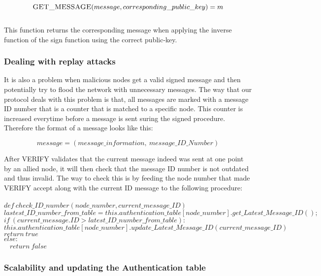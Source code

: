 \documentclass[letterpaper]{article}
\begin{document}
$$\textsc{GET\_MESSAGE}(message, corresponding\_public\_key) = m$$
\\

This function returns the corresponding message when applying the inverse function of the sign function using the correct public-key.

\subsubsection{Dealing with replay attacks}

It is also a problem when malicious nodes get a valid signed message and then potentially try to flood the network with unnecessary messages. The way that our protocol deals with this problem is that, all messages are marked with a message ID number that is a counter that is matched to a specific node. This counter is increased everytime before a message is sent suring the signed procedure. Therefore the format of a message looks like this:

$$message = (message\_information, \ message\_ID\_Number)$$

After \textsc{VERIFY} validates that the current message indeed was sent at one point by an allied node, it will then check that the message ID number is not outdated and thus invalid. The way to check this is by feeding the node number that made VERIFY accept along with the current ID message to the following procedure:\\ \\
$def \ check\_ID\_number(node\_number, current\_message\_ID)$ \\
\hspace*{10 mm} $lastest\_ID\_number\_from\_table = this.authentication\_table[node\_number].get\_Latest\_Message\_ID();$
\hspace*{10 mm} $if \ (current\_message.ID > latest\_ID\_number\_from\_table):$\\
\hspace*{20 mm} $this.authentication\_table[node\_number].update\_Latest\_Message\_ID(current\_message\_ID)$\\
\hspace*{20 mm} $return \ true$ \\
\hspace*{10 mm} $else:$\\ \ 
\hspace*{20 mm} $return \ false$\\


\subsubsection{Scalability and updating the Authentication table}
\end{document}
